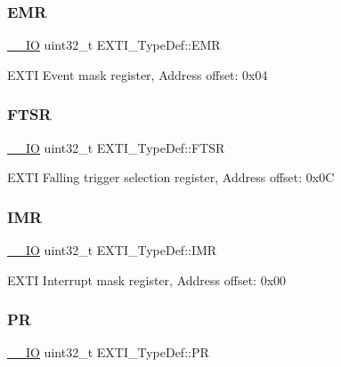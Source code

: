 \subsubsection{\texorpdfstring{E\+MR}{EMR}}
{\footnotesize\ttfamily \hyperlink{core__sc300_8h_aec43007d9998a0a0e01faede4133d6be}{\+\_\+\+\_\+\+IO} uint32\+\_\+t E\+X\+T\+I\+\_\+\+Type\+Def\+::\+E\+MR}

E\+X\+TI Event mask register, Address offset\+: 0x04 \mbox{\label{struct_e_x_t_i___type_def_aee667dc148250bbf37fdc66dc4a9874d}} 
\subsubsection{\texorpdfstring{F\+T\+SR}{FTSR}}
{\footnotesize\ttfamily \hyperlink{core__sc300_8h_aec43007d9998a0a0e01faede4133d6be}{\+\_\+\+\_\+\+IO} uint32\+\_\+t E\+X\+T\+I\+\_\+\+Type\+Def\+::\+F\+T\+SR}

E\+X\+TI Falling trigger selection register, Address offset\+: 0x0C \mbox{\label{struct_e_x_t_i___type_def_a17d061db586d4a5aa646b68495a8e6a4}} 
\subsubsection{\texorpdfstring{I\+MR}{IMR}}
{\footnotesize\ttfamily \hyperlink{core__sc300_8h_aec43007d9998a0a0e01faede4133d6be}{\+\_\+\+\_\+\+IO} uint32\+\_\+t E\+X\+T\+I\+\_\+\+Type\+Def\+::\+I\+MR}

E\+X\+TI Interrupt mask register, Address offset\+: 0x00 \mbox{\label{struct_e_x_t_i___type_def_a133294b87dbe6a01e8d9584338abc39a}} 
\subsubsection{\texorpdfstring{PR}{PR}}
{\footnotesize\ttfamily \hyperlink{core__sc300_8h_aec43007d9998a0a0e01faede4133d6be}{\+\_\+\+\_\+\+IO} uint32\+\_\+t E\+X\+T\+I\+\_\+\+Type\+Def\+::\+PR}

